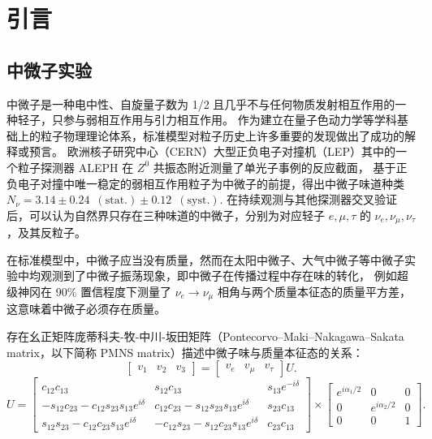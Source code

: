 
\chapter{引言}

\section{中微子实验}
中微子是一种电中性、自旋量子数为 1/2 且几乎不与任何物质发射相互作用的一种轻子，只参与弱相互作用与引力相互作用。
作为建立在量子色动力学等学科基础上的粒子物理理论体系，标准模型对粒子历史上许多重要的发现做出了成功的解释或预言。
欧洲核子研究中心（CERN）大型正负电子对撞机（LEP）其中的一个粒子探测器 ALEPH 在 $Z^0$ 共振态附近测量了单光子事例的反应截面\cite{DECAMP1989519}，
基于正负电子对撞中唯一稳定的弱相互作用粒子为中微子的前提，得出中微子味道种类 $N_\nu=3.14\pm0.24\enspace(\text{stat.})\pm0.12\enspace(\text{syst.})$.
在持续观测与其他探测器交叉验证后，可以认为自然界只存在三种味道的中微子，分别为对应轻子 $e,\mu,\tau$ 的 $\nu_e,\nu_\mu,\nu_\tau$，及其反粒子。

在标准模型中，中微子应当没有质量，然而在太阳中微子、大气中微子等中微子实验中均观测到了中微子振荡现象，即中微子在传播过程中存在味的转化，
例如超级神冈在 90\% 置信程度下测量了 $\nu_e\rightarrow\nu_\mu$ 相角与两个质量本征态的质量平方差\cite{fukudaEvidenceOscillationAtmospheric1998}，
这意味着中微子必须存在质量。

存在幺正矩阵庞蒂科夫-牧-中川-坂田矩阵（Pontecorvo–Maki–Nakagawa–Sakata matrix，以下简称 PMNS matrix）描述中微子味与质量本征态的关系：
\begin{equation}
    \begin{bmatrix}
        v_1&v_2&v_3
    \end{bmatrix}
    =
    \begin{bmatrix}
        v_e&v_\mu&v_\tau
    \end{bmatrix}U.
\end{equation}
\begin{equation}
    U=
    \begin{bmatrix}
    c_{12}c_{13}&s_{12}c_{13}&s_{13}e^{-i\delta}\\-s_{12}c_{23}-c_{12}s_{23}s_{13}e^{i\delta}&c_{12}c_{23}-s_{12}s_{23}s_{13}e^{i\delta}&s_{23}c_{13}\\s_{12}s_{23}-c_{12}c_{23}s_{13}e^{i\delta}&-c_{12}s_{23}-s_{12}c_{23}s_{13}e^{i\delta}&c_{23}c_{13}
    \end{bmatrix}
    \times 
    \begin{bmatrix}
    e^{i\alpha_1/2}&0&0\\0&e^{i\alpha_2/2}&0\\0&0&1
    \end{bmatrix}.
\end{equation}

